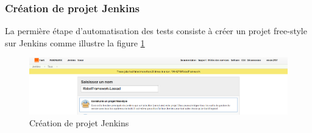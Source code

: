 \subsubsection{Création de projet Jenkins}
La permière étape d'automatisation des tests consiste à créer un projet free-style sur Jenkins comme illustre la figure \ref{fig:creation-projet}
\begin{figure}[H]
	\centering
	\includegraphics[width=0.9\linewidth]{"img/jenkins/creation projet"}
	\caption[Création de projet Jenkins]{Création de projet Jenkins}
	\label{fig:creation-projet}
\end{figure}

